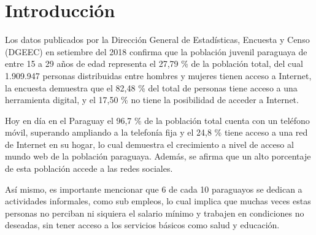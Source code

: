 \documentclass[runningheads]{llncs}
\begin{document}
\begin{abstract}



\end{abstract}



\section{Introducción}

Los datos publicados por la Dirección General de Estadísticas, Encuesta y Censo (DGEEC) en setiembre del 2018 confirma que la población juvenil paraguaya de entre 15 a 29 años de edad representa el 27,79 \% de la población total, del cual 1.909.947 personas distribuidas entre hombres y mujeres tienen acceso a Internet, la encuesta demuestra que el 82,48 \% del total de personas tiene acceso a una herramienta digital, y el 17,50 \% no tiene la posibilidad de acceder a Internet.\cite{1}

Hoy en día en el Paraguay el 96,7 \% de la población total cuenta con un teléfono móvil, superando ampliando a la telefonía fija y el 24,8 \% tiene acceso a una red de Internet en su hogar, lo cual demuestra el crecimiento a nivel de acceso al mundo web de la población paraguaya. Además, se afirma que un alto porcentaje de esta población accede a las redes sociales.\cite{2} 

Así mismo, es importante mencionar que 6 de cada 10 paraguayos se dedican a actividades informales, como sub empleos, lo cual implica que muchas veces estas personas no perciban ni siquiera el salario mínimo y trabajen en condiciones no deseadas, sin tener acceso a los servicios básicos como salud y educación.\cite{12}
\end{document}
